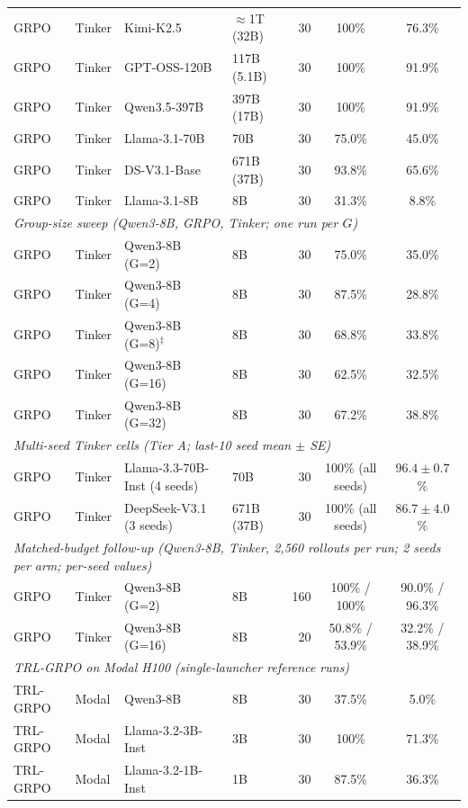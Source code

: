 \begin{table}[htbp]
\begin{tabular}{@{}l l l l r c c@{}}
GRPO & Tinker & Kimi-K2.5 & ${\approx}$1T (32B) & 30 & 100\% & 76.3\% \\
GRPO & Tinker & GPT-OSS-120B & 117B (5.1B) & 30 & 100\% & 91.9\% \\
GRPO & Tinker & Qwen3.5-397B & 397B (17B) & 30 & 100\% & 91.9\% \\
GRPO & Tinker & Llama-3.1-70B & 70B & 30 & 75.0\% & 45.0\% \\
GRPO & Tinker & DS-V3.1-Base & 671B (37B) & 30 & 93.8\% & 65.6\% \\
GRPO & Tinker & Llama-3.1-8B & 8B & 30 & 31.3\% & 8.8\% \\
\midrule
\multicolumn{7}{l}{\textit{Group-size sweep (Qwen3-8B, GRPO, Tinker; one run per $G$)}} \\
\midrule
GRPO & Tinker & Qwen3-8B (G=2) & 8B & 30 & 75.0\% & 35.0\% \\
GRPO & Tinker & Qwen3-8B (G=4) & 8B & 30 & 87.5\% & 28.8\% \\
GRPO & Tinker & Qwen3-8B (G=8)$^\ddagger$ & 8B & 30 & 68.8\% & 33.8\% \\
GRPO & Tinker & Qwen3-8B (G=16) & 8B & 30 & 62.5\% & 32.5\% \\
GRPO & Tinker & Qwen3-8B (G=32) & 8B & 30 & 67.2\% & 38.8\% \\
\midrule
\multicolumn{7}{l}{\textit{Multi-seed Tinker cells (Tier A; last-10 seed mean $\pm$ SE)}} \\
\midrule
GRPO & Tinker & Llama-3.3-70B-Inst (4 seeds) & 70B & 30 & 100\% (all seeds) & $96.4\pm0.7$\% \\
GRPO & Tinker & DeepSeek-V3.1 (3 seeds) & 671B (37B) & 30 & 100\% (all seeds) & $86.7\pm4.0$\% \\
\midrule
\multicolumn{7}{l}{\textit{Matched-budget follow-up (Qwen3-8B, Tinker, 2,560 rollouts per run; 2 seeds per arm; per-seed values)}} \\
\midrule
GRPO & Tinker & Qwen3-8B (G=2) & 8B & 160 & 100\% / 100\% & 90.0\% / 96.3\% \\
GRPO & Tinker & Qwen3-8B (G=16) & 8B & 20 & 50.8\% / 53.9\% & 32.2\% / 38.9\% \\
\midrule
\multicolumn{7}{l}{\textit{TRL-GRPO on Modal H100 (single-launcher reference runs)}} \\
\midrule
TRL-GRPO & Modal & Qwen3-8B & 8B & 30 & 37.5\% & 5.0\% \\
TRL-GRPO & Modal & Llama-3.2-3B-Inst & 3B & 30 & 100\% & 71.3\% \\
TRL-GRPO & Modal & Llama-3.2-1B-Inst & 1B & 30 & 87.5\% & 36.3\% \\

\end{tabular}
\end{table}
